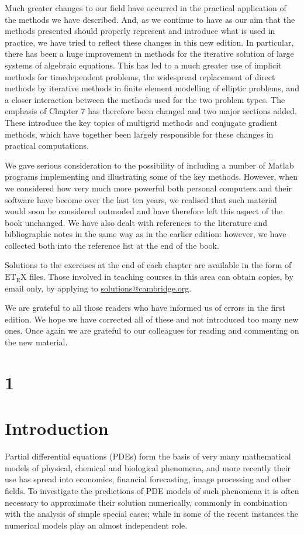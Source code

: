 \documentclass[10pt]{article}
\begin{document}
Much greater changes to our field have occurred in the practical application of the methods we have described. And, as we continue to have as our aim that the methods presented should properly represent and introduce what is used in practice, we have tried to reflect these changes in this new edition. In particular, there has been a huge improvement in methods for the iterative solution of large systems of algebraic equations. This has led to a much greater use of implicit methods for timedependent problems, the widespread replacement of direct methods by iterative methods in finite element modelling of elliptic problems, and a closer interaction between the methods used for the two problem types. The emphasis of Chapter 7 has therefore been changed and two major sections added. These introduce the key topics of multigrid methods and conjugate gradient methods, which have together been largely responsible for these changes in practical computations.

We gave serious consideration to the possibility of including a number of Matlab programs implementing and illustrating some of the key methods. However, when we considered how very much more powerful both personal computers and their software have become over the last ten years, we realised that such material would soon be considered outmoded and have therefore left this aspect of the book unchanged. We have also dealt with references to the literature and bibliographic notes in the same way as in the earlier edition: however, we have collected both into the reference list at the end of the book.

Solutions to the exercises at the end of each chapter are available in the form of \(\mathrm{ET}_{\mathrm{E}} \mathrm{X}\) files. Those involved in teaching courses in this area can obtain copies, by email only, by applying to \href{mailto:solutions@cambridge.org}{solutions@cambridge.org}.

We are grateful to all those readers who have informed us of errors in the first edition. We hope we have corrected all of these and not introduced too many new ones. Once again we are grateful to our colleagues for reading and commenting on the new material.

\section*{1}
\section*{Introduction}
Partial differential equations (PDEs) form the basis of very many mathematical models of physical, chemical and biological phenomena, and more recently their use has spread into economics, financial forecasting, image processing and other fields. To investigate the predictions of PDE models of such phenomena it is often necessary to approximate their solution numerically, commonly in combination with the analysis of simple special cases; while in some of the recent instances the numerical models play an almost independent role.
\end{document}
